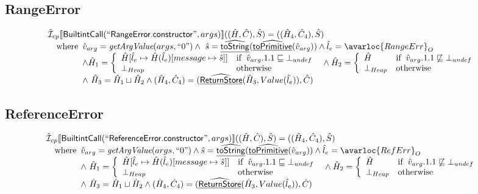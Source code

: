 \subsection{RangeError}
\[
\begin{array}{l}
\aI _{cp}\lbr \SF{BuiltintCall}(``\SF{RangeError.constructor}",args)\rbr((\hat{H},\hat{C}), \hat{S})
  = ((\hat{H}_4, \hat{C}_4), \hat{S})\\
\quad\wherec{
  \hat{v}_{arg} = \hf{getArgValue}(args, ``0")
  \land\ \hat{s}= \ahf{toString}(\ahf{toPrimitive}(\hat{v}_{arg}))
  \land \hat{l}_e = \avarloc{RangeErr}_O\\
  \land \hat{H}_1 = \left\{\begin{array}{ll}
      \hat{H}[\hat{l}_e \mapsto \hat{H}(\hat{l}_e)[message \mapsto \hat{s}]]
      & \ifc{\hat{v}_{arg}.1.1 \sqsubseteq \bot_{undef}}\\
      \bot_{Heap} & \owc
    \end{array}\right.
  \land \hat{H}_2 = \left\{\begin{array}{ll}
      \hat{H}
      & \ifc{\hat{v}_{arg}.1.1 \not\sqsubseteq \bot_{undef}}\\
      \bot_{Heap} & \owc
    \end{array}\right.\\
  \land\ \hat{H}_3 = \hat{H}_1 \sqcup \hat{H}_2
  \land (\hat{H}_4, \hat{C}_4) = (\ahf{ReturnStore}(\hat{H}_3, Value(\hat{l}_e)), \hat{C})\\
  }\\

\end{array}
\]


\subsection{ReferenceError}
\[
\begin{array}{l}
\aI _{cp}\lbr \SF{BuiltintCall}(``\SF{ReferenceError.constructor}",args)\rbr((\hat{H},\hat{C}), \hat{S})
  = ((\hat{H}_4, \hat{C}_4), \hat{S})\\
\quad\wherec{
  \hat{v}_{arg} = \hf{getArgValue}(args, ``0")
  \land \hat{s}= \ahf{toString}(\ahf{toPrimitive}(\hat{v}_{arg}))
  \land \hat{l}_e = \avarloc{RefErr}_O\\
  \land\ \hat{H}_1 = \left\{\begin{array}{ll}
      \hat{H}[\hat{l}_e \mapsto \hat{H}(\hat{l}_e)[message \mapsto \hat{s}]]
      & \ifc{\hat{v}_{arg}.1.1 \sqsubseteq \bot_{undef}}\\
      \bot_{Heap} & \owc
    \end{array}\right.
  \land \hat{H}_2 = \left\{\begin{array}{ll}
      \hat{H}
      & \ifc{\hat{v}_{arg}.1.1 \not\sqsubseteq \bot_{undef}}\\
      \bot_{Heap} & \owc
    \end{array}\right.\\
  \land\ \hat{H}_3 = \hat{H}_1 \sqcup \hat{H}_2
  \land (\hat{H}_4, \hat{C}_4) = (\ahf{ReturnStore}(\hat{H}_3, Value(\hat{l}_e)), \hat{C})\\
  }\\
\end{array}
\]


